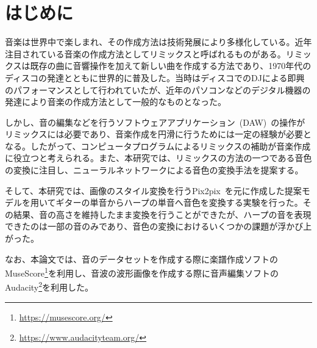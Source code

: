 \chapter{はじめに}

音楽は世界中で楽しまれ、その作成方法は技術発展により多様化している。近年注目されている音楽の作成方法としてリミックスと呼ばれるものがある。リミックスは既存の曲に音響操作を加えて新しい曲を作成する方法であり、1970年代のディスコの発達とともに世界的に普及した。当時はディスコでのDJによる即興のパフォーマンスとして行われていたが、近年のパソコンなどのデジタル機器の発達により音楽の作成方法として一般的なものとなった。

しかし、音の編集などを行うソフトウェアアプリケーション~(DAW)~の操作がリミックスには必要であり、音楽作成を円滑に行うためには一定の経験が必要となる。したがって、コンピュータプログラムによるリミックスの補助が音楽作成に役立つと考えられる。また、本研究では、リミックスの方法の一つである音色の変換に注目し、ニューラルネットワークによる音色の変換手法を提案する。

そして、本研究では、画像のスタイル変換を行うPix2pix~\cite{pix2pix}を元に作成した提案モデルを用いてギターの単音からハープの単音へ音色を変換する実験を行った。その結果、音の高さを維持したまま変換を行うことができたが、ハープの音を表現できたのは一部の音のみであり、音色の変換におけるいくつかの課題が浮かび上がった。

なお、本論文では、音のデータセットを作成する際に楽譜作成ソフトのMuseScore\footnote{\url{https://musescore.org/}}を利用し、音波の波形画像を作成する際に音声編集ソフトのAudacity\footnote{\url{https://www.audacityteam.org/}}を利用した。
